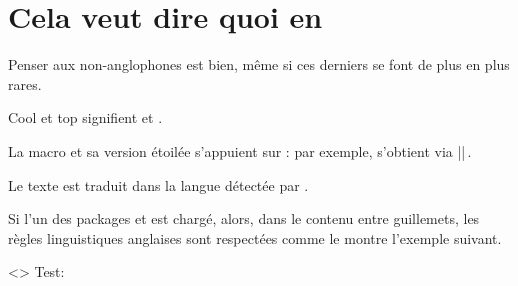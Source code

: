 \documentclass{../main/main}
\begin{document}
\section{Cela veut dire quoi en }

Penser aux non-anglophones est bien, même si ces derniers se font de plus en plus rares.

\begin{tdoclatex}
Cool et top signifient  et .
\end{tdoclatex}


La macro  et sa version étoilée s'appuient sur  : par exemple,  s'obtient via \tdoclatexin||\,.


\begin{tdocnote}
    Le texte  est traduit dans la langue détectée par \thisproj.
\end{tdocnote}


\begin{tdocimp}
	Si l'un des packages  et  est chargé, alors, dans le contenu entre guillemets, les règles linguistiques anglaises sont respectées comme le montre l'exemple suivant.

	\begin{tdoclatex}<>
          Test:   \\
	\end{tdoclatex}
\end{tdocimp}
\end{document}
